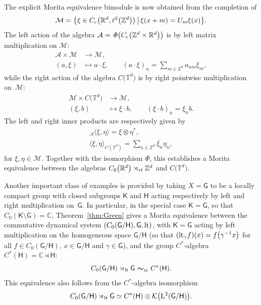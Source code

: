 \documentclass[pdftex]{sigma}
\numberwithin{equation}{section}
\newcommand{\Z}{\zed}
\newcommand{\mbf}[1]{{\boldsymbol {#1} }}
\newcommand{\CK}{\mathcal{K}}
\newcommand{\sfG}{\mathsf{G}}
\newcommand{\sfH}{\mathsf{H}}
\newcommand{\sfK}{\mathsf{K}}
\newcommand{\Leb}{{\rm L}}
\newcommand{\lt}{{\rm lt}}
\newcommand{\rt}{{\rm rt}}
\newcommand{\complex}{{\mathbb C}} %
\newcommand{\zed}{{\mathbb Z}} %
\newcommand{\real}{{\mathbb R}} %
\newcommand{\torus}{{\mathbb T}} %
\def\alg{{\mathcal A}}
\def\Mcal{{\mathcal M}}
\begin{document}
\begin{Example}[tori]
The explicit Morita equivalence bimodule is now obtained from the
completion of
\[
\Mcal = \big\{\xi\in C_{\rm c}\big(\real^d,\ell^2\big(\Z^d\big)\big) \, \big| \, \xi(x+m) =
U_m \xi(x) \big\} .
\]
The left action of the algebra $\alg={\mathit\Phi}\big(C_{\rm c}\big(\Z^d\times\real^d\big)\big)$ is by left
matrix multiplication on $\Mcal$:
\begin{align*}
\alg\times\Mcal &\longrightarrow\Mcal , \\
(a,\xi) & \longmapsto a\cdot\xi , \qquad (a\cdot\xi)_n=\sum_{m\in\Z^d}
a_{nm} \xi_m ,
\end{align*}
while the right action of the algebra $C\big(\torus^d\big)$ is by right pointwise
multiplication on~$\Mcal$:
\begin{align*}
\Mcal\times C\big(\torus^d\big) & \longrightarrow\Mcal , \nonumber \\
(\xi,b) & \longmapsto \xi\cdot b , \qquad (\xi\cdot b)_n=\xi_n b .
\end{align*}
The left and right inner
products are respectively given by
\begin{gather*}
{}_\alg\langle\xi,\eta\rangle = \xi\otimes\eta^* , \\
\langle\xi,\eta\rangle_{C(\torus^d)} = \sum_{n\in\zed^d}
\overline{\xi_n} \eta_n ,
\end{gather*}
for $\xi,\eta\in\Mcal$.
Together with the isomorphism $\mathit\Phi$, this establishes a
Morita equivalence between the algebras $C_0\big(\real^d\big)\rtimes_\rt\zed^d$
and $C\big(\torus^d\big)$.
\end{Example}

Another important class of examples is provided by taking
$X=\sfG$ to be a locally
compact group with closed subgroups $\sfK$ and $\sfH$ acting respectively by
left and right multiplication on~$\sfG$.
In particular, in the special case $\sfK =\sfG$, so that
$C_0(\sfK {\setminus} \sfG)=\complex$, Theorem~\ref{thm:Green} gives a Morita equivalence between the commutative dynamical system
$(C_0(\sfG/\sfH ), \sfG, \lt)$, with $\sfK =\sfG$ acting by left multiplication on the
homogeneous space $\sfG/\sfH $ (so that $(\lt_\gamma f)(x)=f\big(\gamma^{-1} x\big)$ for all $f\in
C_0(\sfG/\sfH )$, $x\in \sfG/\sfH $ and $\gamma\in \sfG$),
and the group $C^*$-algebra $C^*(\sfH )=\complex\rtimes \sfH $:
\[
C_0(\sfG/\sfH )\rtimes_\lt \sfG \ \mbf\sim_{\text{\tiny M}} \ C^*(\sfH ) .
\]
This equivalence also follows from the $C^*$-algebra isomorphism~\cite[Theorem~4.29]{Williams2007}
\[ %
C_0(\sfG/\sfH )\rtimes_\lt \sfG \simeq C^*(\sfH )\otimes
\CK\big(\Leb^2(\sfG/\sfH )\big) .
\]
\end{document}
